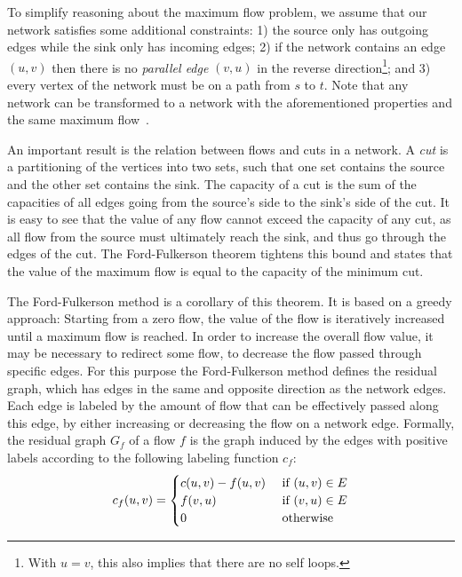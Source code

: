\documentclass{llncs}
\begin{document}
To simplify reasoning about the maximum flow problem, we assume that our network satisfies some additional constraints: 1) the source only has outgoing edges while the sink only has incoming edges; 2) if the network contains an edge $(u, v)$ then there is no \emph{parallel edge} $(v, u)$ in the reverse direction\footnote{With $u=v$, this also implies that there are no self loops.}; and 3) every vertex of the network must be on a path from $s$ to $t$. Note that any network can be transformed to a network with the aforementioned properties and the same maximum flow~\cite{CLRS09}.


An important result is the relation between flows and cuts in a network. A \emph{cut} is a partitioning of the vertices into two sets, such that one set contains 
the source and the other set contains the sink. The capacity of a cut is the sum of the capacities of all edges going from the source's side to the sink's side of the cut.
It is easy to see that the value of any flow cannot exceed the capacity of any cut, as all flow from the source must ultimately reach the sink, and thus go through the edges of the cut. The Ford-Fulkerson theorem tightens this bound and states that the value of the maximum flow is equal to the capacity of the minimum cut.

The Ford-Fulkerson method is a corollary of this theorem. It is based on a greedy approach: Starting from a zero flow, the value of the flow is iteratively increased until a maximum flow is reached. In order to increase the overall flow value, it may be necessary to redirect some flow, \ie to decrease the flow passed through specific edges. For this purpose the Ford-Fulkerson method defines the residual graph, which has edges in the same and opposite direction as the network edges.
Each edge is labeled by the amount of flow that can be effectively passed along this edge, by either increasing or decreasing the flow on a network edge.
Formally, the residual graph $G_f$ of a flow $f$ is the graph induced by the 
edges with positive labels according to the following labeling function $c_f$:
\[ c_f (u, v) = 
  \begin{cases}
  c (u, v) - f(u, v) \hfill & \text{ if $(u, v) \in E$} \\
  f (v, u) \hfill & \text{ if $(v, u) \in E$} \\  
  0 \hfill & \text{ otherwise} \\
  \end{cases} 
\]
\end{document}

